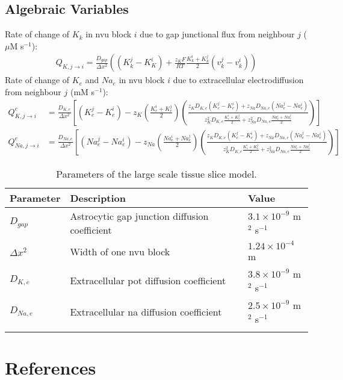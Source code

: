 \documentclass[11pt]{elsarticle}
\newcommand{\mus}{$\mu$M s$^{-1}$\xspace}
\newcommand{\e}[1]{\times 10^{#1}}
\newcommand{\psec}{s$^{-1}$\xspace}
\newcommand\ddfrac[2]{\frac{\displaystyle #1}{\displaystyle #2}}
\newcommand{\na}{\gls{na}\xspace}
\newcommand{\pot}{\gls{pot}\xspace}
\begin{document}
		\subsection{Algebraic Variables}
Rate of change of $K_k$ in \gls{nvu} block $i$ due to gap junctional flux from neighbour $j$ (\mus):
\begin{align}
Q_{K,j \to i} = \frac{D_{gap}}{\Delta x^2} \left( (K_k^j - K_K^i) + \frac{z_K F}{RT} \frac{K_k^i + K_k^j}{2} (v_k^j - v_k^i) \right)
\end{align}
%
Rate of change of $K_e$ and $Na_e$ in \gls{nvu} block $i$ due to extracellular electrodiffusion from neighbour $j$ (mM \psec):
\begin{align}
Q^{e}_{K,j\to i} &= \frac{D_{K,e}}{\Delta x^2} \left[ 
(K_e^j - K_e^i) - z_K \left(\frac{K_e^i + K_e^j}{2}\right) 
\left(   \ddfrac{z_K D_{K,e} (K_e^j - K_e^i) + z_{Na} D_{Na,e} (Na_e^j - Na_e^i)}
{z_K^2 D_{K,e} \frac{K_e^i + K_e^j}{2} + z_{Na}^2 D_{Na,e} \frac{Na_e^i + Na_e^j}{2} }
\right) 
\right]   
\\
Q^{e}_{Na,j\to i} &= \frac{D_{Na,e}}{\Delta x^2} \left[ 
(Na_e^j - Na_e^i) - z_{Na} \left(\frac{Na_e^i + Na_e^j}{2}\right) 
\left(   \ddfrac{z_K D_{K,e} (K_e^j - K_e^i) + z_{Na} D_{Na,e} (Na_e^j - Na_e^i)}
{z_K^2 D_{K,e} \frac{K_e^i + K_e^j}{2} + z_{Na}^2 D_{Na,e} \frac{Na_e^i + Na_e^j}{2} }
\right) 
\right]   
\end{align}
\pagebreak
\begin{longtable}[h!]{ p{0.12\linewidth}   p{0.66\linewidth}   p{0.22\linewidth} }
	\hline
	Parameter & Description & Value \\
	\hline
$D_{gap}$ 		& Astrocytic gap junction diffusion coefficient & $3.1\e{-9}$ m$^2$ \psec \\
$\Delta x^2$ 	& Width of one \gls{nvu} block & $1.24\e{-4}$ m \\
$D_{K,e}$ 		& Extracellular \pot diffusion coefficient & $3.8\e{-9}$ m$^2$ \psec \\
$D_{Na,e}$ 		& Extracellular \na diffusion coefficient & $2.5\e{-9}$ m$^2$ \psec \\
\hline
\caption{Parameters of the large scale tissue slice model.}
\end{longtable}

\section*{References}


\end{document}
